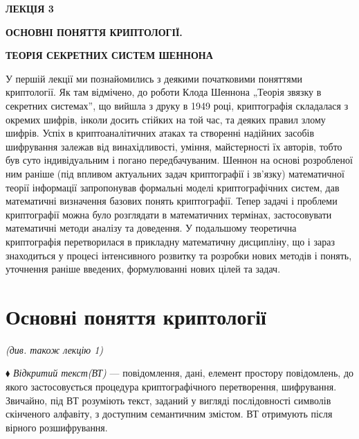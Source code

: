 \bigskip


\bigskip


\bigskip

{\bfseries
ЛЕКЦІЯ  3}


\bigskip

{\centering\bfseries
ОСНОВНІ ПОНЯТТЯ КРИПТОЛОГІЇ.
\par}

{\centering\bfseries
ТЕОРІЯ СЕКРЕТНИХ СИСТЕМ ШЕННОНА
\par}


\bigskip


\bigskip

У першій лекції ми познайомились з деякими початковими поняттями криптології. Як
там відмічено, до роботи Клода Шеннона „Теорія зв{\textquotesingle}язку в
секретних системах”, що вийшла з друку в 1949 році, криптографія складалася з 
окремих шифрів, інколи досить стійких на той час, та деяких правил злому
шифрів. Успіх в криптоаналітичних атаках та створенні надійних засобів
шифрування  залежав від винахідливості, уміння, майстерності їх авторів, тобто
був суто індивідуальним і погано передбачуваним. Шеннон на основі розробленої
ним раніше (під впливом актуальних задач криптографії і зв’язку) математичної
теорії інформації запропонував формальні моделі криптографічних систем, дав
математичні визначення базових понять криптографії. Тепер задачі і проблеми
криптографії можна було розглядати в математичних термінах, застосовувати
математичні методи аналізу та доведення. У подальшому теоретична криптографія 
перетворилася в прикладну математичну дисципліну, що і зараз знаходиться  у
процесі інтенсивного розвитку та розробки нових методів і понять, уточнення
раніше введених, формулюванні нових цілей та задач. 


\bigskip


\bigskip

\section{Основні поняття криптології}

{\centering\itshape
(див. також лекцію 1)
\par}


\bigskip


\bigskip

$\blacklozenge$ \textit{Відкритий текст(ВТ)} --- повідомлення, дані, елемент
простору повідомлень, до якого застосовується процедура криптографічного
перетворення, шифрування. Звичайно, під ВТ розуміють текст, заданий у вигляді
послідовності символів скінченого алфавіту, з доступним семантичним змістом. ВТ
отримують після вірного розшифрування.

